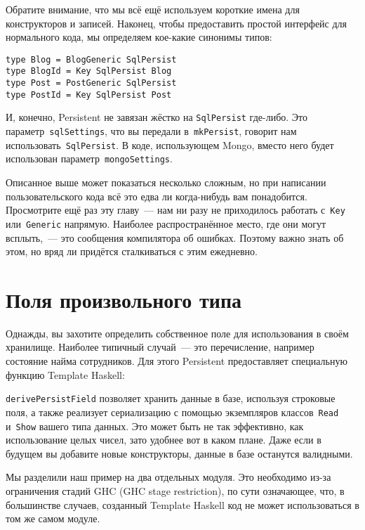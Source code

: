 Обратите внимание, что мы всё ещё используем короткие имена для конструкторов и
записей. Наконец, чтобы предоставить простой интерфейс для нормального кода, мы
определяем кое-какие синонимы типов:

\begin{lstlisting}
type Blog = BlogGeneric SqlPersist
type BlogId = Key SqlPersist Blog
type Post = PostGeneric SqlPersist
type PostId = Key SqlPersist Post
\end{lstlisting}

И, конечно, Persistent не завязан жёстко на \lstinline'SqlPersist' где-либо.
Это параметр~\lstinline'sqlSettings', что вы передали в~\lstinline'mkPersist',
говорит нам использовать~\lstinline'SqlPersist'. В коде, использующем Mongo,
вместо него будет использован параметр~\lstinline'mongoSettings'.

Описанное выше может показаться несколько сложным, но при написании
пользовательского кода всё это едва ли когда-нибудь вам понадобится.
Просмотрите ещё раз эту главу~--- нам ни разу не приходилось работать
с~\lstinline'Key' или~\lstinline'Generic' напрямую. Наиболее распространённое
место, где они могут всплыть,~--- это сообщения компилятора об ошибках. Поэтому
важно знать об этом, но вряд ли придётся сталкиваться с этим ежедневно.

\section{Поля произвольного типа}

Однажды, вы захотите определить собственное поле для использования в своём
хранилище. Наиболее типичный случай~--- это перечисление, например состояние
найма сотрудников. Для этого Persistent предоставляет специальную функцию
Template Haskell:



\lstinline'derivePersistField' позволяет хранить данные в базе, используя
строковые поля, а также реализует сериализацию с помощью экземпляров
классов~\lstinline'Read' и~\lstinline'Show' вашего типа данных. Это может быть
не так эффективно, как использование целых чисел, зато удобнее вот в каком
плане. Даже если в будущем вы добавите новые конструкторы, данные в базе
останутся валидными.

\begin{remark}
    Мы разделили наш пример на два отдельных модуля. Это необходимо из-за
    ограничения стадий GHC (GHC stage restriction), по сути означающее, что, в
    большинстве случаев, созданный Template Haskell код не может
    использоваться в том же самом модуле.
\end{remark}

